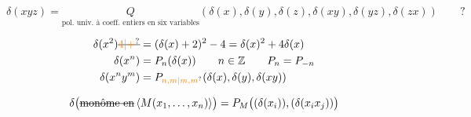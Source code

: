 \[
\boxed{\delta(xyz)=\underset{\text{pol. univ. à coeff. entiers en six variables}}{Q}(\delta(x),\delta(y),\delta(z),\delta(xy),\delta(yz),\delta(zx))\qquad ?}
\]

\[
\begin{aligned}
\delta(x^2)\deleted{\unsure{4|+}}&=(\delta(x)+2)^2-4=\delta(x)^2+4\delta(x)\\
\delta(x^n)&=P_n(\delta(x))\qquad n\in\mathbb Z\qquad P_n=P_{-n}\\
\delta(x^ny^m)&=P_{\unsure{n,m|m,m}}(\delta(x),\delta(y),\delta(xy))
\end{aligned}
\]
\margin{[cas particulier de $\delta(xy)+\delta(xy^{-1})=\ldots$]}

\[
\delta\bigl(\deleted{\text{monôme en}}\,\inserted{M(x_1,\ldots,x_n)}\bigr)=P_M\bigl((\delta(x_i)),(\delta(x_ix_j))\bigr)
\]

